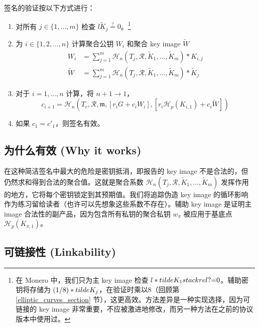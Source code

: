 签名的验证按以下方式进行：

\begin{enumerate}
    \item 对所有 $j \in \{1,...,m\}$ 检查 $l \tilde{K}_j \stackrel{?}{=} 0$。\footnote{在 Monero 中，我们只为主 key image 检查 $l*\\tilde{K}_1 \\stackrel{?}{=} 0$。辅助密钥将存储为 $(1/8)*\\tilde{K}_j$，在验证时乘以8（回顾第 \ref{elliptic_curves_section} 节），这更高效。方法差异是一种实现选择，因为可链接的 key image 非常重要，不应被激进地修改，而另一种方法在之前的协议版本中使用过。}

    \item 为 \(i \in \{1, 2, ..., n\}\) 计算聚合公钥 $W_i$ 和聚合 key image $\tilde{W}$\vspace{.175cm}
    \begin{align*}
    W_i &= \sum^{m}_{j=1} \mathcal{H}_n(T_j, \mathcal{R}, \tilde{K}_1,...,\tilde{K}_{m})*K_{i,j}\\
    \tilde{W} &= \sum^{m}_{j=1} \mathcal{H}_n(T_j, \mathcal{R}, \tilde{K}_1,...,\tilde{K}_{m})*\tilde{K}_j
    \end{align*}{}

	\item 对于 \(i = 1, ..., n\) 计算，将 \(n + 1 \rightarrow 1\)，\vspace{.175cm}
	\[c_{i+1} = \mathcal{H}_n(T_c, \mathcal{R}, \mathfrak{m}, [r_i G + c_i W_i], [r_{i} \mathcal{H}_p(K_{i,1}) + c_i \tilde{W}])\]

	\item 如果 \(c_1 = c'_1\)，则签名有效。
\end{enumerate}


\subsection*{为什么有效 (Why it works)}

在这种简洁签名中最大的危险是密钥抵消，即报告的 key image 不是合法的，但仍然求和得到合法的聚合值。这就是聚合系数 $\mathcal{H}_n(T_j, \mathcal{R}, \tilde{K}_1,...,\tilde{K}_{m})$ 发挥作用的地方，它将每个密钥锁定到其预期值。我们将追踪伪造 key image 的循环影响作为练习留给读者（也许可以先想象这些系数不存在）。辅助 key image 是证明主 image 合法性的副产品，因为包含所有私钥的聚合私钥 $w_{\pi}$ 被应用于基底点 $\mathcal{H}_p(K_{\pi,1})$。


\subsection*{可链接性 (Linkability)}

